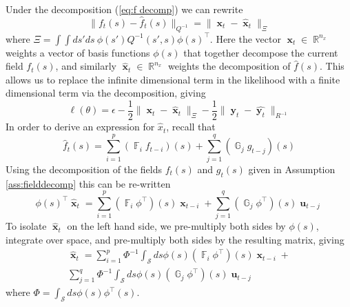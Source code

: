 \documentclass{IEEEtran}
\newcommand{\dist}[2]{\|#1\|_{#2}}
\DeclareMathOperator{\R}{\mathbb{R}}
\DeclareMathOperator{\F}{\mathbb{F}}
\DeclareMathOperator{\G}{\mathbb{G}}
\DeclareMathOperator{\xvec}{\mathbf{x}}
\DeclareMathOperator{\uvec}{\mathbf{u}}
\DeclareMathOperator{\yvec}{\mathbf{y}}
\begin{document}
Under the decomposition (\ref{eq:f decomp}) we can rewrite 
\begin{equation}
	\dist{f_t(s) - \hat{f}_t(s)}{Q^{-1}} = \dist{\xvec_t - \hat{\xvec}_t}{\Xi}
\end{equation}
where $\Xi = \int\int ds' ds ~ \phi(s')Q^{-1}(s',s)\phi(s)^\top$. Here the vector $\xvec_t \in \R^{n_x}$ weights a vector of basis functions $\phi(s)$ that together decompose the current field $f_t(s)$, and similarly $\hat{\xvec}_t \in \R^{n_x}$ weights the decomposition of $\hat{f}(s)$. This allows us to replace the infinite dimensional term in the likelihood with a finite dimensional term via the decomposition, giving
\begin{equation}
	\ell(\theta) =  \epsilon  - \frac{1}{2}\dist{\xvec_t - \hat{\xvec}_t}{\Xi} - \frac{1}{2}\dist{\yvec_t-\hat{\yvec_t}}{R^{-1}}
\end{equation}
In order to derive an expression for $\hat{x}_t$, recall that
\begin{equation}
	\hat{f}_t(s) = \sum_{i=1}^{p}( \F_i f_{t-i})(s) + \sum_{j=1}^{q}(\G_j g_{t-j})(s)
\end{equation}
Using the decomposition of the fields $f_t(s)$ and $g_t(s)$ given in Assumption \ref{ass:fielddecomp} this can be re-written
\begin{equation}
	\phi(s)^\top\hat{\xvec}_t = \sum_{i=1}^{p}(\F_i \phi^\top)(s)\xvec_{t-i} + \sum_{j=1}^{q}(\G_j\phi^\top)(s)\uvec_{t-j}
\end{equation}
To isolate $\hat{\xvec}_t$ on the left hand side, we pre-multiply both sides by $\phi(s)$, integrate over space, and pre-multiply both sides by the resulting matrix, giving
\begin{equation}
	\begin{split}
	\hat{\xvec}_t = 
		\sum_{i=1}^{p} \Phi^{-1} \int_\mathcal{S}ds \phi(s)(\F_i \phi^\top)(s)\xvec_{t-i} + \\
	\sum_{j=1}^{q} \Phi^{-1} \int_\mathcal{S}ds \phi(s)(\G_j\phi^\top)(s)\uvec_{t-j}
	\end{split}
\end{equation}
where $\Phi = \int_\mathcal{S}ds\phi(s)\phi^\top(s)$.
\end{document}
